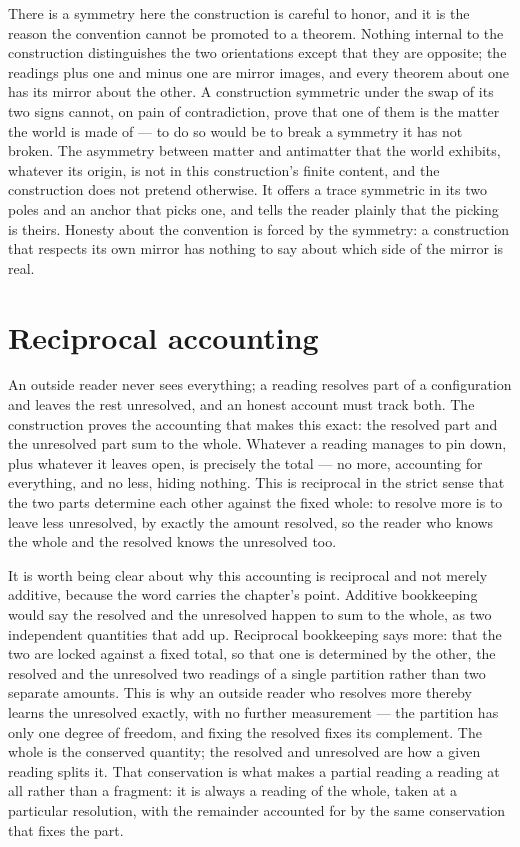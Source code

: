 There is a symmetry here the construction is careful to honor, and it is the reason the convention cannot
be promoted to a theorem. Nothing internal to the construction distinguishes the two orientations except
that they are opposite; the readings plus one and minus one are mirror images, and every theorem about one
has its mirror about the other. A construction symmetric under the swap of its two signs cannot, on pain
of contradiction, prove that one of them is the matter the world is made of --- to do so would be to break
a symmetry it has not broken. The asymmetry between matter and antimatter that the world exhibits,
whatever its origin, is not in this construction's finite content, and the construction does not pretend
otherwise. It offers a trace symmetric in its two poles and an anchor that picks one, and tells the reader
plainly that the picking is theirs. Honesty about the convention is forced by the symmetry: a construction
that respects its own mirror has nothing to say about which side of the mirror is real.

\section{Reciprocal accounting}
\label{se:reciprocal-accounting}

An outside reader never sees everything; a reading resolves part of a configuration and leaves the rest
unresolved, and an honest account must track both. The construction proves the accounting that makes this
exact: the resolved part and the unresolved part sum to the whole. Whatever a reading manages to pin
down, plus whatever it leaves open, is precisely the total --- no more, accounting for everything, and no
less, hiding nothing. This is reciprocal in the strict sense that the two parts determine each other
against the fixed whole: to resolve more is to leave less unresolved, by exactly the amount resolved, so
the reader who knows the whole and the resolved knows the unresolved too.

It is worth being clear about why this accounting is reciprocal and not merely additive, because the word
carries the chapter's point. Additive bookkeeping would say the resolved and the unresolved happen to sum
to the whole, as two independent quantities that add up. Reciprocal bookkeeping says more: that the two
are locked against a fixed total, so that one is determined by the other, the resolved and the unresolved
two readings of a single partition rather than two separate amounts. This is why an outside reader who
resolves more thereby learns the unresolved exactly, with no further measurement --- the partition has
only one degree of freedom, and fixing the resolved fixes its complement. The whole is the conserved
quantity; the resolved and unresolved are how a given reading splits it. That conservation is what makes a
partial reading a reading at all rather than a fragment: it is always a reading of the whole, taken at a
particular resolution, with the remainder accounted for by the same conservation that fixes the part.

